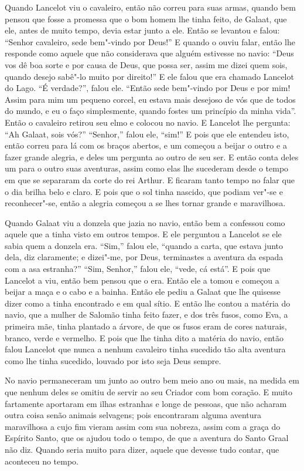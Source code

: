 Quando Lancelot viu o cavaleiro, então não correu para suas armas, quando bem
pensou que fosse a promessa que o bom homem lhe tinha feito, de Galaat, que
ele, antes de muito tempo, devia estar junto a ele. Então se levantou e falou:
“Senhor cavaleiro, sede bem"-vindo por Deus!” E quando o ouviu falar, então lhe
responde como aquele que não considerava que alguém estivesse no navio: “Deus
vos dê boa sorte e por causa de Deus, que possa ser, assim me dizei quem sois,
quando desejo sabê"-lo muito por direito!” E ele falou que era chamado
Lancelot do Lago. “É verdade?”, falou ele. “Então sede bem"-vindo por Deus e
por mim! Assim para mim um pequeno corcel, eu estava mais desejoso de vós que
de todos do mundo, e eu o faço simplesmente, quando fostes um princípio da
minha vida”. Então o cavaleiro retirou seu elmo e colocou no navio. E Lancelot
lhe pergunta: “Ah Galaat, sois vós?” “Senhor,” falou ele, “sim!” E pois que
ele entendeu isto, então correu para lá com os braços abertos, e um começou a
beijar o outro e a fazer grande alegria, e deles um pergunta ao outro de seu
ser. E então conta deles um para o outro suas aventuras, assim como elas lhe
sucederam desde o tempo em que se separaram da corte do rei Arthur. E ficaram
tanto tempo no falar que o dia brilha belo e claro. E pois que o sol tinha
nascido, que podiam ver"-se e reconhecer"-se, então a alegria começou a se lhes
tornar grande e maravilhosa.

Quando Galaat viu a donzela que jazia no navio, então bem a confessou como
aquele que a tinha visto em outros tempos. E ele perguntou a Lancelot se ele
sabia quem a donzela era. “Sim,” falou ele, “quando a carta, que estava junto
dela, diz claramente; e dizei"-me, por Deus, terminastes a aventura da espada
com a asa estranha?” “Sim, Senhor,” falou ele, “vede, cá está”. E pois que
Lancelot a viu, então bem pensou que o era. Então ele a tomou e começou a
beijar a maça e o cabo e a bainha. Então ele pediu a Galaat que lhe quisesse
dizer como a tinha encontrado e em qual sítio. E então lhe contou a matéria do
navio, que a mulher de Salomão tinha feito fazer, e dos três fusos, como Eva, a
primeira mãe, tinha plantado a árvore, de que os fusos eram de cores naturais,
branco, verde e vermelho. E pois que lhe tinha dito a matéria do navio, então
falou Lancelot que nunca a nenhum cavaleiro tinha sucedido tão alta aventura
como lhe tinha sucedido, louvado por isto seja Deus sempre. 

No navio permaneceram um junto ao outro bem meio ano ou mais, na medida em que
nenhum deles se omitiu de servir ao seu Criador com bom coração. E muito
fartamente aportaram em ilhas estranhas e longe de pessoas, que não acharam
outra coisa senão animais selvagens; pois encontraram alguma aventura
maravilhosa a cujo fim vieram assim com sua nobreza, assim com a graça do
Espírito Santo, que os ajudou todo o tempo, de que a aventura do Santo Graal
não diz. Quando seria muito para dizer, aquele que devesse tudo contar, que
aconteceu no tempo. 

